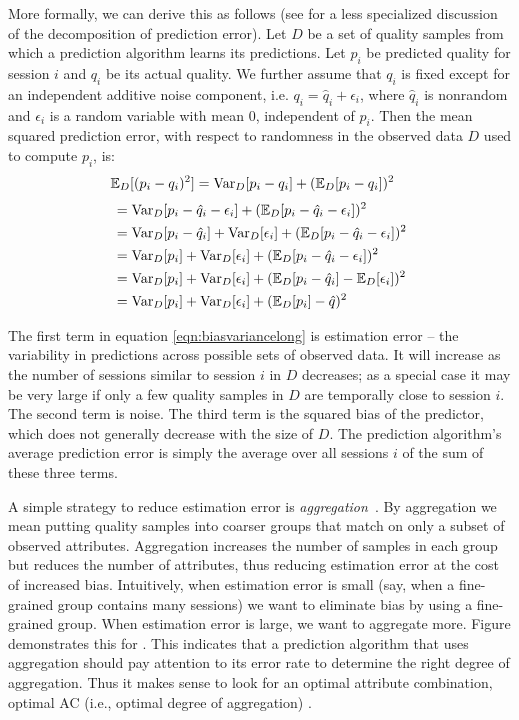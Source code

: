 More formally, we can derive this as follows (see \cite{domingos2000unified} for a less specialized discussion of the decomposition of prediction error).  Let $D$ be a set of quality samples from which a prediction algorithm learns its predictions.  Let $p_i$ be predicted quality for session $i$ and $q_i$ be its actual quality.  We further assume that $q_i$ is fixed except for an independent additive noise component, i.e. $q_i = \hat{q}_i + \epsilon_i$, where $\hat{q}_i$ is nonrandom and $\epsilon_i$ is a random variable with mean $0$, independent of $p_i$.  Then the mean squared prediction error, with respect to randomness in the observed data $D$ used to compute $p_i$, is:
\begin{align}
  \label{eqn:biasvariance}
  \operatorname{\mathbb{E}}_D[(p_i - q_i)^2] &= \operatorname{\text{Var}}_D[p_i - q_i] + (\operatorname{\mathbb{E}}_D[p_i - q_i])^2
\end{align}
\begin{align*}
  \label{eqn:biasvariancelong}
  &= \operatorname{\text{Var}}_D[p_i - \hat{q}_i - \epsilon_i] + (\operatorname{\mathbb{E}}_D[p_i - \hat{q}_i - \epsilon_i])^2 \\
  &= \operatorname{\text{Var}}_D[p_i - \hat{q}_i] + \operatorname{\text{Var}}_D[\epsilon_i] + (\operatorname{\mathbb{E}}_D[p_i - \hat{q}_i - \epsilon_i])^2\\
  &= \operatorname{\text{Var}}_D[p_i] + \operatorname{\text{Var}}_D[\epsilon_i] + (\operatorname{\mathbb{E}}_D[p_i - \hat{q}_i - \epsilon_i])^2\\
  &= \operatorname{\text{Var}}_D[p_i] + \operatorname{\text{Var}}_D[\epsilon_i] + (\operatorname{\mathbb{E}}_D[p_i - \hat{q}_i] - \operatorname{\mathbb{E}}_D[\epsilon_i])^2\\
  &= \operatorname{\text{Var}}_D[p_i] + \operatorname{\text{Var}}_D[\epsilon_i] + (\operatorname{\mathbb{E}}_D[p_i] - \hat{q})^2
\end{align*}

The first term in equation \eqref{eqn:biasvariancelong} is estimation error -- the variability in predictions across possible sets of observed data.  It will increase as the number of sessions similar to session $i$ in $D$ decreases; as a special case it may be very large if only a few quality samples in $D$ are temporally close to session $i$.  The second term is noise.  The third term is the squared bias of the predictor, which does not generally decrease with the size of $D$.  The prediction algorithm's average prediction error is simply the average over all sessions $i$ of the sum of these three terms.

A simple strategy to reduce estimation error is {\it aggregation}~\cite{any citation?}.  By aggregation we mean putting quality samples into coarser groups that match on only a subset of observed attributes.  Aggregation increases the number of samples in each group but reduces the number of attributes, thus reducing estimation error at the cost of increased bias. 
Intuitively, when estimation error is small (say, when a fine-grained group contains many sessions) we want to eliminate bias by using a fine-grained group.  When estimation error is large, we want to aggregate more.  Figure \fillme demonstrates this for \fillme{}.  This indicates that a prediction algorithm that uses aggregation should pay attention to its error rate to determine the right degree of aggregation.
Thus it makes sense to look for an optimal attribute combination, optimal AC (i.e., optimal degree of aggregation) . 

